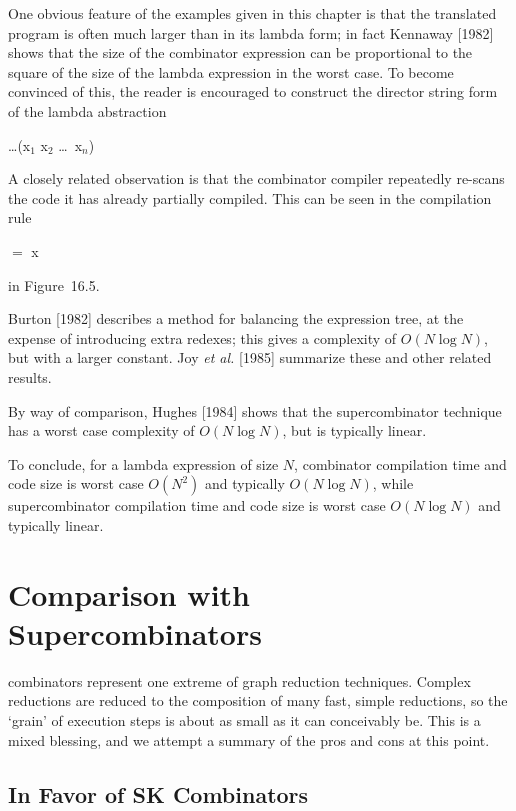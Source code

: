 One obvious feature of the examples given in this chapter is that the translated program is often much larger than in its lambda form; in fact Kennaway [1982] shows that the size of the combinator expression can be proportional to the square of the size of the lambda expression in the worst case. To become convinced of this, the reader is encouraged to construct the director string form of the lambda abstraction
\begin{mlcoded}
    \ldots{}(x$_1$ x$_2$ \ldots\ x$_n$)
\end{mlcoded}
A closely related observation is that the  combinator compiler repeatedly re-scans the code it has already partially compiled. This can be seen in the compilation rule
\begin{mlcoded}
     $=$  x 
\end{mlcoded}
in Figure~16.5.

Burton [1982] describes a method for balancing the expression tree, at the expense of introducing extra redexes; this gives a complexity of $O(N\log N)$,
but with a larger constant. Joy \textit{et al.} [1985] summarize these and other related results.

By way of comparison, Hughes [1984] shows that the supercombinator technique has a worst case complexity of $O(N\log N)$, but is typically linear.

To conclude, for a lambda expression of size $N$,  combinator compilation time and code size is worst case $O(N^2)$ and typically $O(N\log N)$, while supercombinator compilation time and code size is worst case $O(N\log N)$ and typically linear.

\section{Comparison with Supercombinators}

 combinators represent one extreme of graph reduction techniques. Complex reductions are reduced to the composition of many fast, simple reductions, so the `grain' of execution steps is about as small as it can conceivably be. This is a mixed blessing, and we attempt a summary of the pros and cons at this point.

\subsection{In Favor of {\sffamily SK} Combinators}

